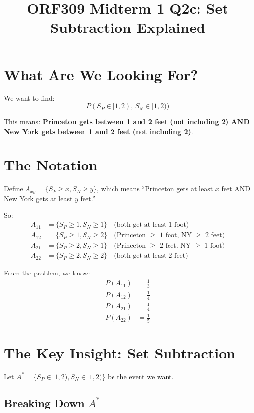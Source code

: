 \documentclass[11pt]{article}
\title{ORF309 Midterm 1 Q2c: Set Subtraction Explained}
\author{}
\date{}
\begin{document}
\maketitle

\section*{What Are We Looking For?}

We want to find:
\[
P(S_P \in [1,2), \, S_N \in [1,2))
\]

This means: \textbf{Princeton gets between 1 and 2 feet (not including 2) AND New York gets between 1 and 2 feet (not including 2)}.

\section*{The Notation}

Define $A_{xy} = \{S_P \geq x, S_N \geq y\}$, which means ``Princeton gets at least $x$ feet AND New York gets at least $y$ feet.''

So:
\begin{align*}
A_{11} &= \{S_P \geq 1, S_N \geq 1\} \quad \text{(both get at least 1 foot)} \\
A_{12} &= \{S_P \geq 1, S_N \geq 2\} \quad \text{(Princeton $\geq$ 1 foot, NY $\geq$ 2 feet)} \\
A_{21} &= \{S_P \geq 2, S_N \geq 1\} \quad \text{(Princeton $\geq$ 2 feet, NY $\geq$ 1 foot)} \\
A_{22} &= \{S_P \geq 2, S_N \geq 2\} \quad \text{(both get at least 2 feet)}
\end{align*}

From the problem, we know:
\begin{align*}
P(A_{11}) &= \frac{1}{3} \\
P(A_{12}) &= \frac{1}{4} \\
P(A_{21}) &= \frac{1}{4} \\
P(A_{22}) &= \frac{1}{5}
\end{align*}

\section*{The Key Insight: Set Subtraction}

Let $A^* = \{S_P \in [1,2), S_N \in [1,2)\}$ be the event we want.

\subsection*{Breaking Down $A^*$}
\end{document}
